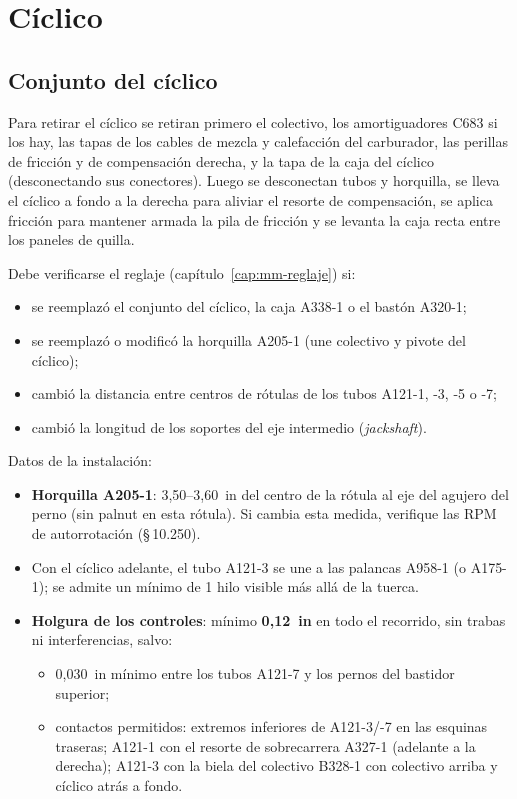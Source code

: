 \section{Cíclico}

\subsection{Conjunto del cíclico}

Para retirar el cíclico se retiran primero el colectivo, los amortiguadores C683 si los hay, las tapas de los cables de mezcla y calefacción del carburador, las perillas de fricción y de compensación derecha, y la tapa de la caja del cíclico (desconectando sus conectores). Luego se desconectan tubos y horquilla, se lleva el cíclico a fondo a la derecha para aliviar el resorte de compensación, se aplica fricción para mantener armada la pila de fricción y se levanta la caja recta entre los paneles de quilla.

\begin{precaucion}
Debe verificarse el reglaje (capítulo~\ref{cap:mm-reglaje}) si:
\begin{itemize}
\item se reemplazó el conjunto del cíclico, la caja A338-1 o el bastón A320-1;
\item se reemplazó o modificó la horquilla A205-1 (une colectivo y pivote del cíclico);
\item cambió la distancia entre centros de rótulas de los tubos A121-1, -3, -5 o -7;
\item cambió la longitud de los soportes del eje intermedio (\emph{jackshaft}).
\end{itemize}
\end{precaucion}

Datos de la instalación:
\begin{itemize}
\item \textbf{Horquilla A205-1}: 3,50--3,60~in del centro de la rótula al eje del agujero del perno (sin palnut en esta rótula). Si cambia esta medida, verifique las RPM de autorrotación (\S\,10.250).
\item Con el cíclico adelante, el tubo A121-3 se une a las palancas A958-1 (o A175-1); se admite un mínimo de 1 hilo visible más allá de la tuerca.
\item \textbf{Holgura de los controles}: mínimo \textbf{0,12~in} en todo el recorrido, sin trabas ni interferencias, salvo:
 \begin{itemize}
 \item 0,030~in mínimo entre los tubos A121-7 y los pernos del bastidor superior;
 \item contactos permitidos: extremos inferiores de A121-3/-7 en las esquinas traseras; A121-1 con el resorte de sobrecarrera A327-1 (adelante a la derecha); A121-3 con la biela del colectivo B328-1 con colectivo arriba y cíclico atrás a fondo.
 \end{itemize}
\end{itemize}

